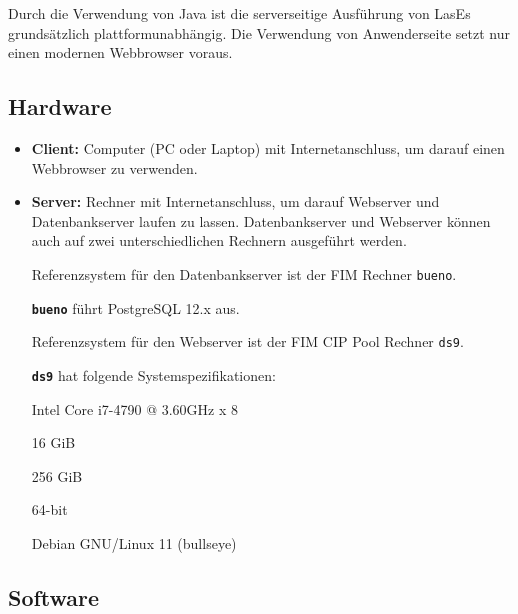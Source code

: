 
Durch die Verwendung von Java ist die serverseitige Ausführung von LasEs
grundsätzlich plattformunabhängig.
Die Verwendung von Anwenderseite setzt nur einen modernen Webbrowser voraus.

\subsection{Hardware}

\begin{itemize}
	\item \textbf{Client:} Computer (PC oder Laptop) mit Internetanschluss, um darauf einen Webbrowser zu verwenden.

	\item \textbf{Server:} Rechner mit Internetanschluss, um darauf Webserver und Datenbankserver laufen zu lassen. Datenbankserver und Webserver können auch auf zwei unterschiedlichen Rechnern ausgeführt werden.

	\label{dbspezi}
	Referenzsystem für den Datenbankserver ist der FIM Rechner \texttt{bueno}.

	\texttt{\textbf{bueno}} führt PostgreSQL 12.x aus.

	\label{spezi}

	Referenzsystem für den Webserver ist der FIM CIP Pool Rechner \texttt{ds9}.

	\texttt{\textbf{ds9}} hat folgende Systemspezifikationen:

	\begin{itemize}
		 Intel Core i7-4790 @ 3.60GHz x 8

		 16 GiB

		 256 GiB

		 64-bit

		 Debian GNU/Linux 11 (bullseye)
	\end{itemize}


\end{itemize}

\subsection{Software}

